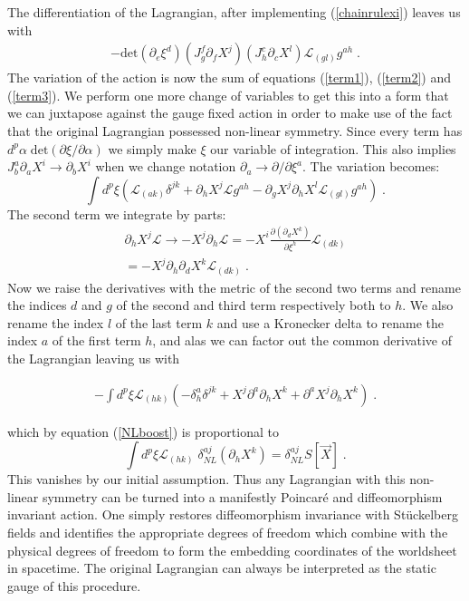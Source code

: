 \documentclass[%
 reprint,
 amsmath,amssymb,
 aps,
]{revtex4-1}
\begin{document}
The differentiation of the Lagrangian, after implementing (\ref{chainrulexi}) leaves us with
\begin{eqnarray}
\label{term3}
    - \mathrm{det} ( \partial_e \xi^d ) ( J^f_g \partial_f X^j )
    ( J^c_h \partial_{c} X^l ) \mathcal{L}_{(g l)} g^{a h} \; .
\end{eqnarray}
The variation of the action is now the sum of equations (\ref{term1}), (\ref{term2}) and (\ref{term3}).  We perform one more change
of variables to get this into a form that we can juxtapose against the gauge fixed action in order to
make use of the fact that the original Lagrangian possessed non-linear symmetry.  Since
every term has $d^p \alpha\;\mathrm{det}\left( \partial \xi/\partial \alpha\right)$ we simply make $\xi$
our variable of integration. This also implies $J^a_b \partial_a X^i \rightarrow \partial_b X^i$ when we change notation $\partial_a \rightarrow \partial/\partial \xi^a$.
The variation becomes:
\begin{equation}
\label{diffeq}
    \int d^p \xi \left(
    \mathcal{L}_{(a k)} \delta^{j k}
    + \partial_h X^j \mathcal{L} g^{a h}
    - \partial_g X^j \partial_h X^l \mathcal{L}_{(g l)} g^{a h} \right) \; .
\end{equation}
The second term we integrate by parts:
\begin{gather}
    \partial_h X^j \mathcal{L} \rightarrow
    - X^j \partial_h \mathcal{L} = - X^i \frac{\partial (\partial_d X^k)}{\partial \xi^h}
    \mathcal{L}_{(d k)} \nonumber \\
    = - X^j \partial_h \partial_d X^k \mathcal{L}_{(d k)} \; . \nonumber
\end{gather}
Now we raise the derivatives with the metric of the second two terms and rename
the indices $d$ and $g$ of the second and third term respectively both to $h$. We also
rename the index $l$ of the last term $k$ and use a Kronecker delta to rename the index
$a$ of the first term $h$, and alas we can factor out the common derivative of
the Lagrangian leaving us with
\begin{widetext}
    \begin{eqnarray}
        -\int d^p \xi \mathcal{L}_{(h k)}
        \left( - \delta^a_h \delta^{j k} + X^j \partial^a \partial_h X^k
        + \partial^a X^j \partial_h X^k \right) \; . \nonumber
    \end{eqnarray}
\end{widetext}
which by equation (\ref{NLboost}) is proportional to
\begin{equation}
    \int d^p \xi \mathcal{L}_{(h k)} \; \delta^{a j}_{NL} (\partial_h X^k)
    = \delta^{a j}_{NL} S[\vec{X}] \; .
\end{equation}
This vanishes by our initial assumption. Thus any Lagrangian with this non-linear symmetry can be turned into a
manifestly Poincar\'{e} and diffeomorphism invariant action. One simply restores diffeomorphism invariance
with St\"uckelberg fields and identifies the appropriate degrees of freedom which combine with the physical
degrees of freedom to form the embedding coordinates of the worldsheet in spacetime. The original
Lagrangian can always be interpreted as the static gauge of this procedure.
\end{document}
